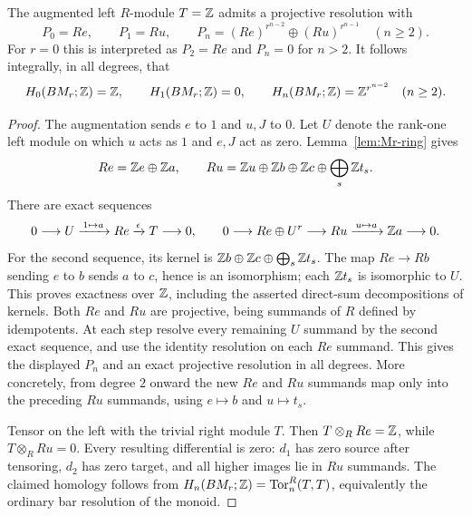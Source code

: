 \begin{proposition}\label{prop:Mr-homology}
The augmented left $R$-module $T=\mathbb Z$ admits a projective resolution with
\[
 P_0=Re,\qquad P_1=Ru,\qquad
 P_n=(Re)^{r^{n-2}}\oplus(Ru)^{r^{n-1}}\quad(n\geq2).
\]
For $r=0$ this is interpreted as $P_2=Re$ and $P_n=0$ for $n>2$.
It follows integrally, in all degrees, that
\[
 H_0(BM_r;\mathbb Z)=\mathbb Z,\qquad H_1(BM_r;\mathbb Z)=0,\qquad
 H_n(BM_r;\mathbb Z)=\mathbb Z^{r^{n-2}}\quad(n\geq2).
\]
\end{proposition}
\begin{proof}
The augmentation sends $e$ to $1$ and $u,J$ to $0$.
Let $U$ denote the rank-one left module on which $u$ acts as $1$ and
$e,J$ act as zero.  Lemma~\ref{lem:Mr-ring} gives
\[
 Re=\mathbb Z e\oplus\mathbb Z a,\qquad
 Ru=\mathbb Z u\oplus\mathbb Z b\oplus\mathbb Z c\oplus\bigoplus_s\mathbb Z t_s.
\]
There are exact sequences
\[
 0\longrightarrow U\xrightarrow{\,1\mapsto a\,}Re
      \xrightarrow{\epsilon}T\longrightarrow0,
 \qquad
 0\longrightarrow Re\oplus U^{r}\longrightarrow Ru
      \xrightarrow{\,u\mapsto a\,}\mathbb Z a\longrightarrow0.
\]
For the second sequence, its kernel is
$\mathbb Z b\oplus\mathbb Z c\oplus\bigoplus_s\mathbb Z t_s$.
The map $Re\to Rb$ sending $e$ to $b$ sends $a$ to $c$, hence is an
isomorphism; each $\mathbb Z t_s$ is isomorphic to $U$.  This proves exactness
over $\mathbb Z$, including the asserted direct-sum decompositions of kernels.
Both $Re$ and $Ru$ are projective, being summands of $R$ defined by
idempotents.  At each step resolve every remaining $U$ summand by the
second exact sequence, and use the identity resolution on each $Re$
summand.  This gives the displayed $P_n$ and an exact projective
resolution in all degrees.  More concretely, from degree $2$ onward the
new $Re$ and $Ru$ summands map only into the preceding $Ru$ summands,
using $e\mapsto b$ and $u\mapsto t_s$.

Tensor on the left with the trivial right module $T$.  Then
$T\otimes_R Re=\mathbb Z$, while $T\otimes_R Ru=0$.  Every resulting
differential is zero: $d_1$ has zero source after tensoring, $d_2$ has
zero target, and all higher images lie in $Ru$ summands.  The claimed
homology follows from
$H_n(BM_r;\mathbb Z)=\operatorname{Tor}^{R}_n(T,T)$, equivalently the ordinary
bar resolution of the monoid.
\end{proof}

